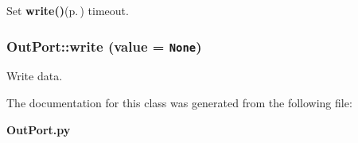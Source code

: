 Set {\bf write()}{\rm (p.\,\pageref{classOutPort_OutPorta2})} timeout. 

\subsubsection{\setlength{\rightskip}{0pt plus 5cm}Out\-Port::write (value = {\tt None})}\label{classOutPort_OutPorta2}


Write data. 



The documentation for this class was generated from the following file:\begin{CompactItemize}
\item 
{\bf Out\-Port.py}\end{CompactItemize}
